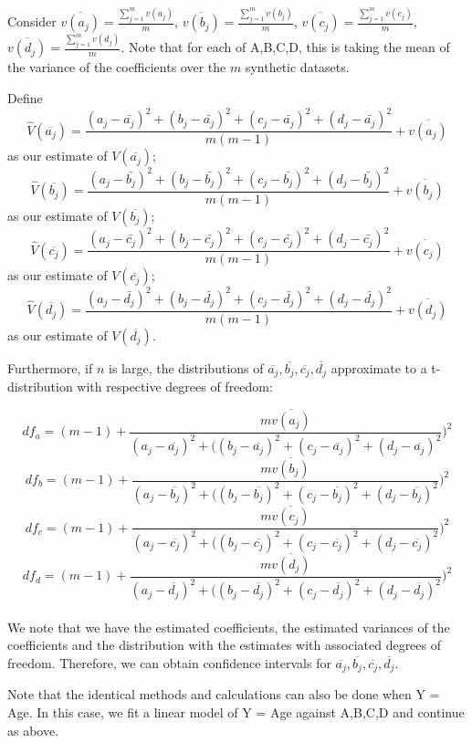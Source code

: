 \documentclass[12pt]{article}
\begin{document}
Consider $\overline{v(a_j)} = \frac{\sum_{j=1}^{m} v(a_j)}{m}$, $\overline{v(b_j)} = \frac{\sum_{j=1}^{m} v(b_j)}{m}$, $\overline{v(c_j)} = \frac{\sum_{j=1}^{m} v(c_j)}{m}$, $\overline{v(d_j)} = \frac{\sum_{j=1}^{m} v(d_j)}{m}$. Note that for each of A,B,C,D, this is taking the mean of the variance of the coefficients over the $m$ synthetic datasets. 

Define $$\hat{V}(\overline{a_j}) = \frac{(a_j - \bar{a_j})^2 + (b_j - \bar{a_j})^2 + (c_j - \bar{a_j})^2 + (d_j - \bar{a_j})^2}{m(m-1)} + \overline{v(a_j)}$$ as our estimate of $V(\overline{a_j})$; $$\hat{V}(\overline{b_j}) = \frac{(a_j - \bar{b_j})^2 + (b_j - \bar{b_j})^2 + (c_j - \bar{b_j})^2 + (d_j - \bar{b_j})^2}{m(m-1)} + \overline{v(b_j)}$$ as our estimate of $V(\overline{b_j})$; $$\hat{V}(\overline{c_j}) = \frac{(a_j - \bar{c_j})^2 + (b_j - \bar{c_j})^2 + (c_j - \bar{c_j})^2 + (d_j - \bar{c_j})^2}{m(m-1)} + \overline{v(c_j)}$$ as our estimate of $V(\overline{c_j})$;
$$\hat{V}(\overline{d_j}) = \frac{(a_j - \bar{d_j})^2 + (b_j - \bar{d_j})^2 + (c_j - \bar{d_j})^2 + (d_j - \bar{d_j})^2}{m(m-1)} + \overline{v(d_j)}$$ as our estimate of $V(\overline{d_j})$.

Furthermore, if $n$ is large, the distributions of $\overline{a_j},\overline{b_j},\overline{c_j},\overline{d_j}$ approximate to a t-distribution with respective degrees of freedom: 

$$df_a = (m-1) + \frac{m \overline{v(a_j)}}{(a_j - \overline{a_j})^2 + ((b_j - \overline{a_j})^2 + (c_j - \overline{a_j})^2 + (d_j - \overline{a_j})^2})^2$$
$$df_b = (m-1) + \frac{m \overline{v(b_j)}}{(a_j - \overline{b_j})^2 + ((b_j - \overline{b_j})^2 + (c_j - \overline{b_j})^2 + (d_j - \overline{b_j})^2})^2$$
$$df_c = (m-1) + \frac{m \overline{v(c_j)}}{(a_j - \overline{c_j})^2 + ((b_j - \overline{c_j})^2 + (c_j - \overline{c_j})^2 + (d_j - \overline{c_j})^2})^2$$
$$df_d = (m-1) + \frac{m \overline{v(d_j)}}{(a_j - \overline{d_j})^2 + ((b_j - \overline{d_j})^2 + (c_j - \overline{d_j})^2 + (d_j - \overline{d_j})^2})^2$$
\\
We note that we have the estimated coefficients, the estimated variances of the coefficients and the distribution with the estimates with associated degrees of freedom. Therefore, we can obtain confidence intervals for $\overline{a_j},\overline{b_j},\overline{c_j},\overline{d_j}$.

Note that the identical methods and calculations can also be done when Y = Age. In this case, we fit a linear model of Y = Age against A,B,C,D and continue as above.
\end{document}
